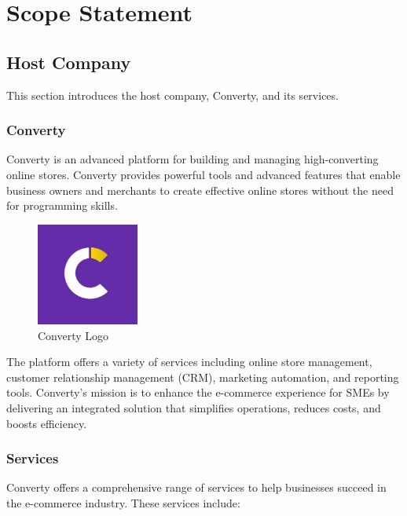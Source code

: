 \chapter{Scope Statement}
\setcounter{minitocdepth}{1}
\minitoc
\newpage

\section{Host Company}
This section introduces the host company, Converty, and its services.
\subsection{Converty}
Converty is an advanced platform for building and managing high-converting online stores. Converty provides powerful tools and advanced features that enable business owners and merchants to create effective online stores without the need for programming skills.

\begin{figure}[H]
  \centering
  \includegraphics[width=0.3\textwidth]{Images/convertyLogo.jpeg}
  \caption{Converty Logo}
  \label{fig:Converty Logo}
\end{figure}

The platform offers a variety of services including online store management, customer relationship management (CRM), marketing automation, and reporting tools. Converty's mission is to enhance the e-commerce experience for SMEs by delivering an integrated solution that simplifies operations, reduces costs, and boosts efficiency.
\newline

\subsection{Services}
Converty offers a comprehensive range of services to help businesses succeed in the e-commerce industry. These services include:

